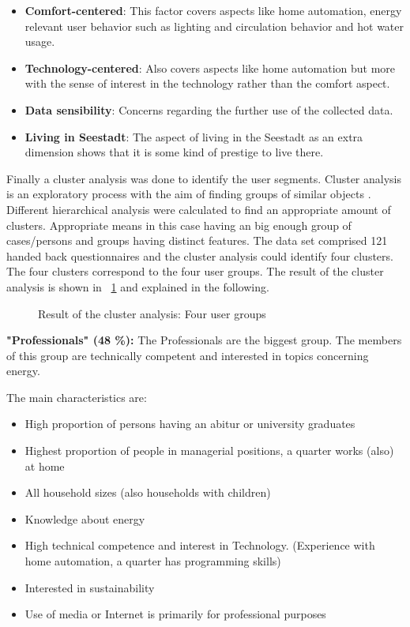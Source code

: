 \begin{itemize}
	\item \textbf{Comfort-centered}: This factor covers aspects like home automation, energy relevant user behavior such as lighting and circulation behavior and hot water usage. 
	\item \textbf{Technology-centered}: Also covers aspects like home automation but more with the sense of interest in the technology rather than the comfort aspect.
	\item \textbf{Data sensibility}: Concerns regarding the further use of the collected data.
	\item \textbf{Living in Seestadt}: The aspect of living in the Seestadt as an extra dimension shows that it is some kind of prestige to live there.
\end{itemize}

Finally a cluster analysis was done to identify the user segments. Cluster analysis is an exploratory process with the aim of finding groups of similar objects \cite{tuffery2011data}. Different hierarchical analysis were calculated to find an appropriate amount of clusters. Appropriate means in this case having an big enough group of cases/persons and groups having distinct features. The data set comprised 121 handed back questionnaires and the cluster analysis could identify four clusters. The four clusters correspond to the four user groups. The result of the cluster analysis is shown in ~\ref{fig:cluster} and explained in the following.

\begin{figure}[h]
	\centering
	\caption{Result of the cluster analysis: Four user groups}
	\label{fig:cluster} %
\end{figure}


\textbf{"Professionals" (48 \%):}
The Professionals are the biggest group. The members of this group are technically competent and interested in topics concerning energy.

The main characteristics are:
\begin{itemize}
	\item High proportion of persons having an abitur or university graduates
	\item Highest proportion of people in managerial positions, a quarter works (also) at home
	\item All household sizes (also households with children)
	\item Knowledge about energy
	\item High technical competence and interest in Technology. (Experience with home automation, a quarter has programming skills)
	\item Interested in sustainability
	\item Use of media or Internet is primarily for professional purposes
\end{itemize}

